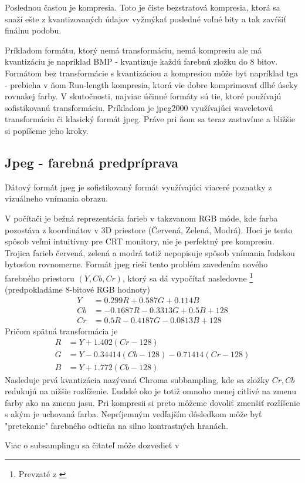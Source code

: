 Poslednou časťou je kompresia. Toto je čiste bezstratová kompresia,
ktorá sa snaží ešte z kvantizovaných údajov vyžmýkať posledné voľné
bity a tak zavŕšiť finálnu podobu.

Príkladom formátu, ktorý nemá transformáciu, nemá kompresiu ale má
kvantizáciu je napríklad BMP - kvantizuje každú farebnú zložku do 8
bitov. Formátom bez transformácie s kvantizáciou a kompresiou môže byť
napríklad tga - prebieha v ňom Run-length kompresia, ktorá vie dobre
komprimovať dlhé úseky rovnakej farby.
V skutočnosti, najviac účinné formáty sú tie, ktoré používajú
sofistikovanú transformáciu. Príkladom je jpeg2000 využívajúci
waveletovú transformáciu či klasický formát jpeg. Práve pri ňom sa
teraz zastavíme a bližšie si popíšeme jeho kroky.

\subsection{Jpeg - farebná predpríprava}
Dátový formát jpeg je sofistikovaný formát využívajúci viaceré
poznatky z vizuálneho vnímania obrazu.

V počítači je bežná reprezentácia farieb v takzvanom RGB móde, kde
farba pozostáva z koordinátov v 3D priestore (Červená, Zelená, Modrá).
Hoci je tento spôsob veľmi intuitívny pre CRT monitory, nie je
perfektný pre kompresiu. Trojica farieb červená, zelená a modrá totiž
nepopisuje spôsob vnímania ľudskou bytosťou rovnomerne. Formát jpeg
rieši tento problém zavedením nového farebného priestoru $(Y,Cb,Cr)$,
ktorý sa dá vypočítať nasledovne \footnote{Prevzaté z \cite{jfif}} 
(predpokladáme 8-bitové RGB hodnoty)
\begin{align*}
    Y &= 0.299 R + 0.587 G + 0.114 B \\
    Cb &= -0.1687R - 0.3313G + 0.5B + 128 \\
    Cr &= 0.5R - 0.4187 G - 0.0813B + 128
\end{align*}
Pričom spätná transformácia je
\begin{align*}
    R &= Y + 1.402 (Cr - 128) \\
    G &= Y - 0.34414 (Cb-128) - 0.71414 (Cr-128) \\
    B &= Y + 1.772 (Cb - 128)
\end{align*}
Nasleduje prvá kvantizácia nazývaná Chroma subbampling, 
kde sa zložky  $Cr, Cb$ redukujú na nižšie
rozlíženie. Ľudské oko je totiž omnoho menej citlivé na zmenu farby
ako na zmenu jasu. Pri kompresii si preto môžeme dovoliť zmenšiť
rozlíšenie s akým je uchovaná farba.
Nepríjemným vedľajším dôsledkom môže byť "pretekanie" farebného
odtieňa na silno kontrastných hranách.
\begin{poznamka}
Viac o subsamplingu sa čitateľ môže dozvedieť v 
\cite{subsampling}
\end{poznamka}


